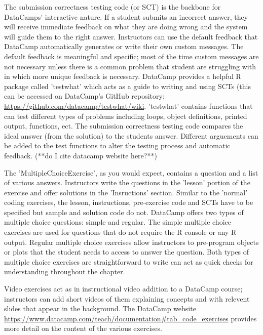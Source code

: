 \documentclass[12pt]{article}
\begin{document}
The submission correctness testing code (or SCT) is the backbone for DataCamps' interactive nature. If a student submits an incorrect answer, they will 
receive immediate feedback on what they are doing wrong and the system will guide them to the right answer. Instructors can use the default feedback
that DataCamp automatically generates or write their own custom messages. The default feedback is meaningful and specific; most of the time custom 
messages are not necessary unless there is a common problem that student are struggling with in which more unique feedback is necessary. 
DataCamp provides a helpful R package called 'testwhat' which acts as a guide to writing and using SCTs (this can be accessed on DataCamp's GitHub 
repository: \url{https://github.com/datacamp/testwhat/wiki}. 
'testwhat' contains functions that can test different types of problems including loops, object definitions, printed output, functions, ect.
The submission correctness testing code compares the ideal answer (from the solution) to the students answer. Different
arguements can be added to the test functions to alter the testing process and automatic feedback. (**do I cite datacamp website here?**)





The 'MultipleChoiceExercise', as you would expect, contains a question and a list of various answers. Instructors write the questions in the 'lesson'
portion of the exercise and offer solutions in the 'Insructions' section. Similar to the 'normal' coding exercises, the lesson, instructions, pre-exercise 
code and SCTs have to be specified but sample and solution code do not. DataCamp offers two types of multiple choice questions: simple and regular. 
The simple multiple choice exercises are used for questions that do not require the R console or any R output. Regular multiple choice exercises 
allow instructors to pre-program objects or plots that the student needs to access to answer the question. Both types of multiple choice exercises 
are straightforward to write can act as quick checks for understanding throughout the chapter.


Video exercises act as in instructional video addition to a DataCamp course; instructors can add short videos of them explaining concepts and with 
relevent slides that appear in the background. The DataCamp website \url{https://www.datacamp.com/teach/documentation#tab_code_exercises} provides 
more detail on the content of the various exercises. 
\end{document}
